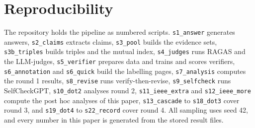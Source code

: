 \documentclass[conference]{IEEEtran}
\begin{document}
\section{Reproducibility}
The repository holds the pipeline as numbered scripts. \texttt{s1\_answer} generates answers, \texttt{s2\_claims} extracts claims, \texttt{s3\_pool} builds the evidence sets, \texttt{s3b\_triples} builds triples and the mutual index, \texttt{s4\_judges} runs RAGAS and the LLM-judges, \texttt{s5\_verifier} prepares data and trains and scores verifiers, \texttt{s6\_annotation} and \texttt{s6\_quick} build the labelling pages, \texttt{s7\_analysis} computes the round 1 results, \texttt{s8\_revise} runs verify-then-revise, \texttt{s9\_selfcheck} runs SelfCheckGPT, \texttt{s10\_dot2} analyses round 2, \texttt{s11\_ieee\_extra} and \texttt{s12\_ieee\_more} compute the post hoc analyses of this paper, \texttt{s13\_cascade} to \texttt{s18\_dot3} cover round 3, and \texttt{s19\_dot4} to \texttt{s22\_record} cover round 4. All sampling uses seed 42, and every number in this paper is generated from the stored result files.
\end{document}
